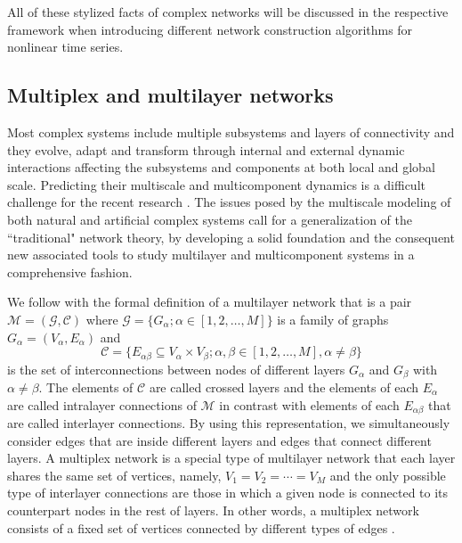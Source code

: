 	All of these stylized facts of complex networks will be discussed in the respective framework when introducing different network construction algorithms for nonlinear time series. 
	
		\subsection{Multiplex and multilayer networks} \label{sec:multiplex}
		Most complex systems include multiple subsystems and layers of connectivity and they evolve, adapt and transform through internal and external dynamic interactions affecting the subsystems and components at both local and global scale. Predicting their multiscale and multicomponent dynamics is a difficult challenge for the recent research \cite{Boccaletti2014}. The issues posed by the multiscale modeling of both natural and artificial complex systems call for a generalization of the ``traditional" network theory, by developing a solid foundation and the consequent new associated tools to study multilayer and multicomponent systems in a comprehensive fashion. 
		
		We follow with the formal definition of a multilayer network \cite{Boccaletti2014} that is a pair $\mathcal{M} = (\mathcal{G}, \mathcal{C})$ where $\mathcal{G} = \{G_{\alpha}; \alpha \in [1, 2, \dots, M]\}$ is a family of graphs $G_{\alpha} = (V_{\alpha}, E_{\alpha})$ and 
		\begin{equation}
		\mathcal{C} = \{ E_{\alpha\beta} \subseteq V_{\alpha} \times V_{\beta}; \alpha, \beta \in [1, 2, \dots, M], \alpha \neq \beta \}
		\end{equation}
		is the set of interconnections between nodes of different layers $G_{\alpha}$ and $G_{\beta}$ with $\alpha \neq \beta$. The elements of $\mathcal{C}$ are called crossed layers and the elements of each $E_{\alpha}$ are called intralayer connections of $\mathcal{M}$ in contrast with elements of each $E_{\alpha\beta}$ that are called interlayer connections. By using this representation, we simultaneously consider edges that are inside different layers and edges that connect different layers. A multiplex network is a special type of multilayer network that each layer shares the same set of vertices, namely, $V_{1} = V_{2} = \cdots = V_M$ and the only possible type of interlayer connections are those in which a given node is connected to its counterpart nodes in the rest of layers.  In other words, a multiplex network consists of a fixed set of vertices connected by different types of edges \cite{Boccaletti2014}. 
		

